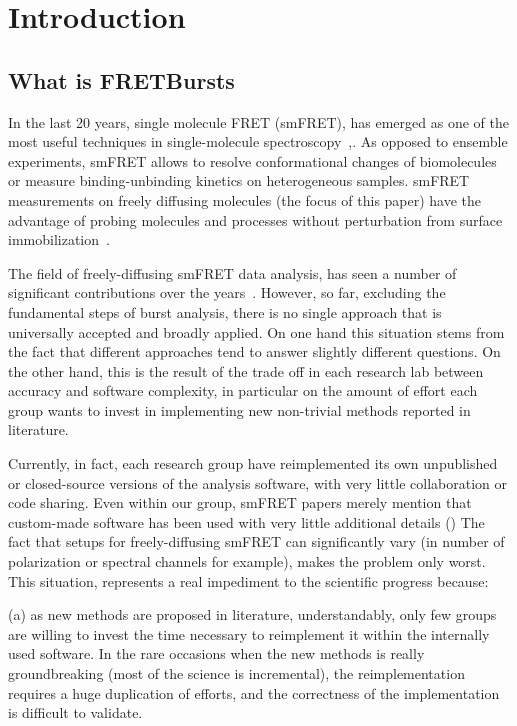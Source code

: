 \section{Introduction}

\subsection{What is FRETBursts}

In the last 20 years, single molecule FRET (smFRET), has emerged as one of the most
useful techniques in single-molecule spectroscopy~\cite{Weiss_1999},\cite{Hohlbein_2014}. 
As opposed to ensemble experiments, smFRET allows to resolve conformational 
changes of biomolecules or measure binding-unbinding kinetics on heterogeneous samples. 
smFRET measurements on freely diffusing molecules (the focus of this paper) have the advantage 
of probing molecules and processes without perturbation from surface immobilization~\cite{Dahan_1999}\cite{Eggeling_1998}. 

The field of freely-diffusing smFRET data analysis, has seen a number of significant 
contributions over the years~\cite{Fries_1998}\cite{Eggeling_2001}\cite{Zhang_2005}\cite{Gopich_2005}\cite{Lee_2005}\cite{Nir_2006}\cite{Antonik2006}\cite{Gopich_2007}\cite{Gopich_2008}\cite{Camley_2009}\cite{Santoso_2010}\cite{Torella_2011}\cite{Tomov_2012}. However, so far, excluding the fundamental steps of burst analysis, 
there is no single approach that is universally accepted and broadly applied. 
On one hand this situation stems from the fact that
different approaches tend to answer slightly different questions.
On the other hand, this is the result of the trade off in each research lab
between accuracy and software complexity, in particular on the amount of effort
each group wants to invest in implementing new non-trivial methods reported in literature.

Currently, in fact,
each research group have reimplemented its own unpublished or closed-source versions
of the analysis software, with very little collaboration or code sharing.
Even within our group, smFRET papers merely mention that custom-made software has been
used with very little additional details ()
The fact that setups for freely-diffusing smFRET can significantly 
vary (in number of polarization or spectral channels for example), 
makes the problem only worst.
This situation, represents a real impediment to the scientific progress because:

(a) as new methods are proposed in literature, understandably, only few 
groups are willing to invest the time necessary to reimplement it within 
the internally used software. In the rare occasions when the new methods 
is really groundbreaking (most of the science is incremental), the reimplementation requires 
a huge duplication of efforts, and the correctness of the implementation
is difficult to validate.

